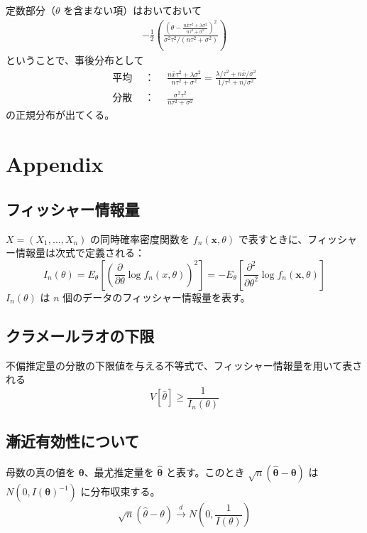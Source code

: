 \documentclass[10pt, a4paper]{ltjsarticle}
\begin{document}
定数部分（$\theta$ を含まない項）はおいておいて
\begin{eqnarray}
  -\frac{1}{2} \left( \frac{\left( \theta - \frac{n\bar{x}\tau^2 + \lambda\sigma^2}{n\tau^2+\sigma^2}\right)^2}{\sigma^2\tau^2/(n\tau^2+\sigma^2)} \right)
\end{eqnarray}
ということで、事後分布として　
\begin{eqnarray}
  平均~~&：&~~\frac{n\bar{x}\tau^2 + \lambda\sigma^2}{n\tau^2+\sigma^2} = \frac{\lambda/\tau^2 + n\bar{x}/\sigma^2}{1/\tau^2+n/\sigma^2} \\ 
  分散~~&：&~~\frac{\sigma^2\tau^2}{n\tau^2+\sigma^2} 
\end{eqnarray}
の正規分布が出てくる。

\newpage
\section{Appendix}

\subsection{フィッシャー情報量}

$X=(X_1,...,X_n)$ の同時確率密度関数を $f_n(\bm{x},\theta)$ で表すときに、フィッシャー情報量は次式で定義される：
\begin{equation}
  I_n(\theta) = E_\theta\left[ \left(\frac{\partial}{\partial \theta} \log f_n(x,\theta) \right)^2\right] 
  = -E_\theta \left[ \frac{\partial^2}{\partial\theta^2} \log f_n(\bm{x},\theta)\right]
\end{equation}
$I_n(\theta)$ は $n$ 個のデータのフィッシャー情報量を表す。


\subsection{クラメールラオの下限}

不偏推定量の分散の下限値を与える不等式で、フィッシャー情報量を用いて表される
\begin{equation}
  V[\hat{\theta}] \geq \frac{1}{I_n(\theta)}
\end{equation}

\subsection{漸近有効性について}
母数の真の値を $\bm{\theta}$、最尤推定量を $\hat{\bm{\theta}}$ と表す。このとき $\sqrt{n}(\hat{\bm{\theta}}-\bm{\theta})$ は
$N(0, I(\bm{\theta})^{-1})$ に分布収束する。
\begin{equation}
  \sqrt{n}(\hat{\theta}-\theta) \xrightarrow{d} N\left(0, \frac{1}{I(\theta)} \right)
\end{equation}
\end{document}
